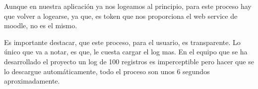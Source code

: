 Aunque en nuestra aplicación ya nos logeamos al principio, para este proceso hay que volver a logearse, ya que, es token que nos proporciona el web service de moodle, no es el mismo.

Es importante destacar, que este proceso, para el usuario, es transparente. Lo único que va a notar, es que, le cuesta cargar el log mas. En el equipo que se ha desarrollado el proyecto un log de 100 registros es imperceptible pero hacer que se lo descargue automáticamente, todo el proceso son unos 6 segundos aproximadamente.
 